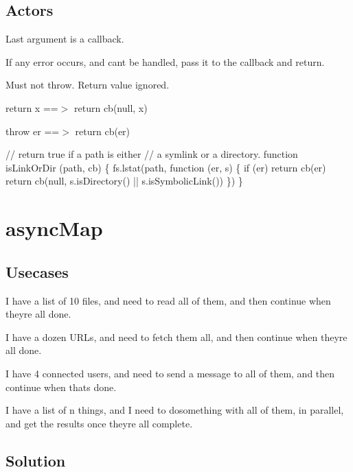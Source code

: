 \subsection*{Actors}


\begin{DoxyItemize}
\item Last argument is a callback.
\item If any error occurs, and can\textquotesingle{}t be handled, pass it to the callback and return.
\item Must not throw. Return value ignored.
\item return x ==$>$ return cb(null, x)
\item throw er ==$>$ return cb(er)
\end{DoxyItemize}


\begin{DoxyCode}
// return true if a path is either
// a symlink or a directory.
function isLinkOrDir (path, cb) \{
  fs.lstat(path, function (er, s) \{
    if (er) return cb(er)
    return cb(null, s.isDirectory() || s.isSymbolicLink())
  \})
\}
\end{DoxyCode}


\section*{async\+Map}

\subsection*{Usecases}


\begin{DoxyItemize}
\item I have a list of 10 files, and need to read all of them, and then continue when they\textquotesingle{}re all done.
\item I have a dozen U\+R\+Ls, and need to fetch them all, and then continue when they\textquotesingle{}re all done.
\item I have 4 connected users, and need to send a message to all of them, and then continue when that\textquotesingle{}s done.
\item I have a list of n things, and I need to dosomething with all of them, in parallel, and get the results once they\textquotesingle{}re all complete.
\end{DoxyItemize}

\subsection*{Solution}


